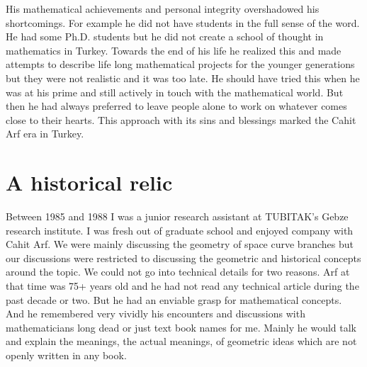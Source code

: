 \documentclass[12pt]{amsart}
\begin{document}
His mathematical achievements and personal integrity overshadowed his shortcomings. For example he did not have students in the full sense of the word. He had some Ph.D. students but he did not create a school of thought in mathematics in Turkey. Towards the end of his life he realized this and made attempts to describe life long mathematical projects for the younger generations but they were not realistic and it was too late. He should have tried this when he was at his prime and still actively in touch with the mathematical world. But then he had always preferred to leave people alone to work on whatever comes close to their hearts. This approach with its sins and blessings marked the  Cahit Arf era in Turkey.

\section{A historical relic}

\begin{center}
\end{center}

Between 1985 and 1988 I was a junior research assistant at TUBITAK's Gebze research institute. I was fresh out of graduate school and enjoyed company with Cahit Arf. We were mainly discussing the geometry of space curve branches but our discussions were restricted to discussing the geometric and historical concepts around the topic. We could not go into technical details for two reasons. Arf at that time was 75+ years old and he had not read any technical article during the past decade or two. But he had an enviable grasp for mathematical concepts. And he remembered very vividly his encounters and discussions with mathematicians long dead or just text book names for me. Mainly he would talk and explain the meanings, the actual meanings, of geometric ideas which are not openly written in any book.
\end{document}
